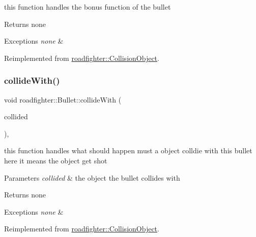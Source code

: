 this function handles the bonus function of the bullet \begin{DoxyReturn}{Returns}
none 
\end{DoxyReturn}

\begin{DoxyExceptions}{Exceptions}
{\em none} & \\
\hline
\end{DoxyExceptions}


Reimplemented from \hyperlink{classroadfighter_1_1CollisionObject_ad35887bb3cfb8c054eaaee56306d6944}{roadfighter\+::\+Collision\+Object}.

\mbox{\label{classroadfighter_1_1Bullet_a36156632331e59c11abf5ae76024bc1f}} 
\subsubsection{\texorpdfstring{collide\+With()}{collideWith()}}
{\footnotesize\ttfamily void roadfighter\+::\+Bullet\+::collide\+With (\begin{DoxyParamCaption}\item[{std\+::shared\+\_\+ptr$<$ \hyperlink{classroadfighter_1_1CollisionObject}{Collision\+Object} $>$ \&}]{collided }\end{DoxyParamCaption})\hspace{0.3cm}{\ttfamily [override]}, {\ttfamily [virtual]}}

this function handles what should happen must a object colldie with this bullet here it means the object get shot 
\begin{DoxyParams}{Parameters}
{\em collided} & the object the bullet collides with \\
\hline
\end{DoxyParams}
\begin{DoxyReturn}{Returns}
none 
\end{DoxyReturn}

\begin{DoxyExceptions}{Exceptions}
{\em none} & \\
\hline
\end{DoxyExceptions}


Reimplemented from \hyperlink{classroadfighter_1_1CollisionObject_a9eba85551432f548f2a0c20217a60f42}{roadfighter\+::\+Collision\+Object}.

